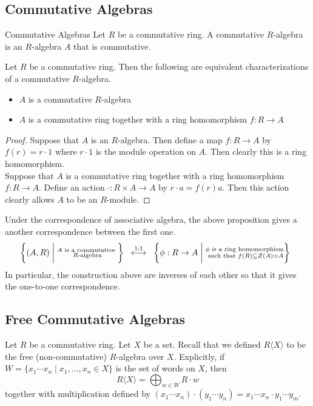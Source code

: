 \documentclass[a4paper]{article}
\begin{document}
\subsection{Commutative Algebras}
\begin{defn}{Commutative Algebras}{} Let $R$ be a commutative ring. A commutative $R$-algebra is an $R$-algebra $A$ that is commutative. 
\end{defn}

\begin{prp}{}{} Let $R$ be a commutative ring. Then the following are equivalent characterizations of a commutative $R$-algebra. 
\begin{itemize}
\item $A$ is a commutative $R$-algebra
\item $A$ is a commutative ring together with a ring homomorphism $f:R\to A$
\end{itemize}
\begin{proof}
Suppose that $A$ is an $R$-algebra. Then define a map $f:R\to A$ by $f(r)=r\cdot 1$ where $r\cdot 1$ is the module operation on $A$. Then clearly this is a ring homomorphism. \\
Suppose that $A$ is a commutative ring together with a ring homomorphism $f:R\to A$. Define an action $\cdot:R\times A\to A$ by $r\cdot a=f(r)a$. Then this action clearly allows $A$ to be an $R$-module. 
\end{proof}
\end{prp}

Under the correspondence of associative algebra, the above proposition gives a another correspondence between the first one. $$\left\{(A,R)\;\bigg{|}\;\substack{A\text{ is a commutative }\\R\text{-algebra}}\right\}\;\;\overset{1:1}{\longleftrightarrow}\;\;\left\{\phi:R\to A\;\bigg{|}\;\substack{\phi\text{ is a ring homomorphism}\\\text{ such that }f(R)\subseteq Z(A)=A}\right\}\;\;$$ In particular, the construction above are inverses of each other so that it gives the one-to-one correspondence. 

\subsection{Free Commutative Algebras}
Let $R$ be a commutative ring. Let $X$ be a set. Recall that we defined $R\langle X\rangle$ to be the free (non-commutative) $R$-algebra over $X$. Explicitly, if $W=\{x_1\cdots x_n\;|\;x_1,\dots,x_n\in X\}$ is the set of words on $X$, then $$R\langle X\rangle=\bigoplus_{w\in W}R\cdot w$$ together with multiplication defined by $(x_1\cdots x_n)\cdot(y_1\cdots y_n)=x_1\cdots x_n\cdot y_1\cdots y_m$. 
\end{document}
